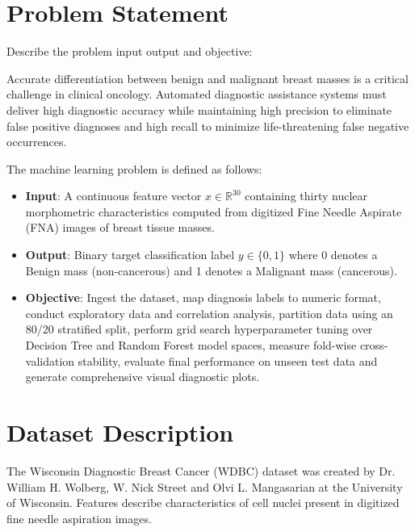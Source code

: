 \documentclass[12pt,a4paper]{article}
\begin{document}
\section{Problem Statement}
Describe the problem input output and objective:

Accurate differentiation between benign and malignant breast masses is a critical challenge in clinical oncology. Automated diagnostic assistance systems must deliver high diagnostic accuracy while maintaining high precision to eliminate false positive diagnoses and high recall to minimize life-threatening false negative occurrences.

The machine learning problem is defined as follows:
\begin{itemize}
\item \textbf{Input}: A continuous feature vector $x \in \mathbb{R}^{30}$ containing thirty nuclear morphometric characteristics computed from digitized Fine Needle Aspirate (FNA) images of breast tissue masses.
\item \textbf{Output}: Binary target classification label $y \in \{0, 1\}$ where 0 denotes a Benign mass (non-cancerous) and 1 denotes a Malignant mass (cancerous).
\item \textbf{Objective}: Ingest the dataset, map diagnosis labels to numeric format, conduct exploratory data and correlation analysis, partition data using an 80/20 stratified split, perform grid search hyperparameter tuning over Decision Tree and Random Forest model spaces, measure fold-wise cross-validation stability, evaluate final performance on unseen test data and generate comprehensive visual diagnostic plots.
\end{itemize}

\section{Dataset Description}

The Wisconsin Diagnostic Breast Cancer (WDBC) dataset was created by Dr. William H. Wolberg, W. Nick Street and Olvi L. Mangasarian at the University of Wisconsin. Features describe characteristics of cell nuclei present in digitized fine needle aspiration images.
\end{document}
